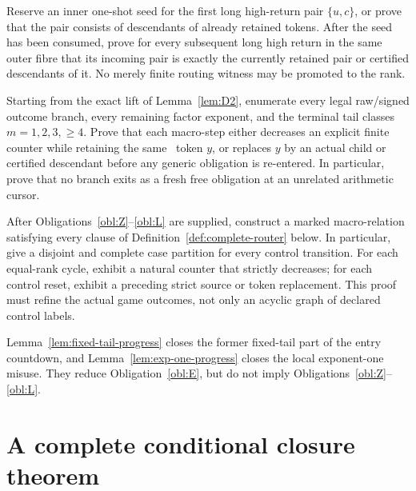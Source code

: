 \begin{obligation}\label{obl:H}
Reserve an inner one-shot seed for the first long high-return pair
$\{u,c\}$, or prove that the pair consists of descendants of already retained
tokens.  After the seed has been consumed, prove for every subsequent long
high return in the same outer fibre that its incoming pair is exactly the
currently retained pair or certified descendants of it.  No merely finite
routing witness may be promoted to the rank.
\end{obligation}

\begin{obligation}[L: complete LOSS-anchored $D=2$ module]\label{obl:L}
Starting from the exact lift of Lemma~\ref{lem:D2}, enumerate every legal
raw/signed outcome branch, every remaining factor exponent, and the terminal
tail classes $m=1,2,3,\ge4$.  Prove that each macro-step either decreases an
explicit finite counter while retaining the same \LOSS\ token $y$, or
replaces $y$ by an actual child or certified descendant before any generic
obligation is re-entered.  In particular, prove that no branch exits as a
fresh free obligation at an unrelated arithmetic cursor.
\end{obligation}

\begin{obligation}\label{obl:E}
After Obligations~\ref{obl:Z}--\ref{obl:L} are supplied, construct a
marked macro-relation satisfying every clause of
Definition~\ref{def:complete-router} below.  In particular, give a disjoint
and complete case partition for every control transition.  For each
equal-rank cycle, exhibit a natural counter that strictly decreases; for
each control reset, exhibit a preceding strict source or token replacement.
This proof must refine the actual game outcomes, not only an acyclic graph
of declared control labels.
\end{obligation}

\begin{remark}
Lemma~\ref{lem:fixed-tail-progress} closes the former fixed-tail part of the
entry countdown, and Lemma~\ref{lem:exp-one-progress} closes the local
exponent-one misuse.  They reduce Obligation~\ref{obl:E}, but do not imply
Obligations~\ref{obl:Z}--\ref{obl:L}.
\end{remark}

\section{A complete conditional closure theorem}

